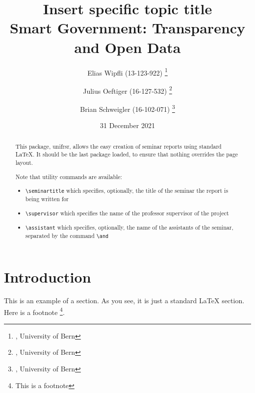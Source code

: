 \documentclass[a4paper,12pt]{article}
\begin{document}

\title{
   Insert specific topic title \\
   \large Smart Government: Transparency and Open Data} %


\author{
   Elias Wipfli (13-123-922) 
   \thanks{, University of Bern}
   \and
   Julius Oeftiger (16-127-532) 
   \thanks{, University of Bern}
   \and
   Brian Schweigler (16-102-071)
   \thanks{, University of Bern}
}



\date{31 December 2021} %

\maketitle

\begin{abstract}
This package, \textsf{unifrsr}, allows the easy creation of seminar
reports using standard \LaTeX. It should be the last
package loaded, to ensure that nothing overrides the page layout.

Note that utility commands are available: 
\begin{itemize}
\item \verb+\seminartitle+ which specifies, optionally, the title of the seminar the report is being written for
\item \verb+\supervisor+ which specifies the name of the professor supervisor of the project
\item \verb+\assistant+ which specifies, optionally, the name of the assistants of the seminar, separated by the command \verb+\and+
\end{itemize}


\end{abstract}

\tableofcontents
\newpage

\section{Introduction}
This is an example of a section. As you see, it is just a standard
{\LaTeX} section. Here is a footnote%
\footnote{This is a footnote}.
\end{document}
